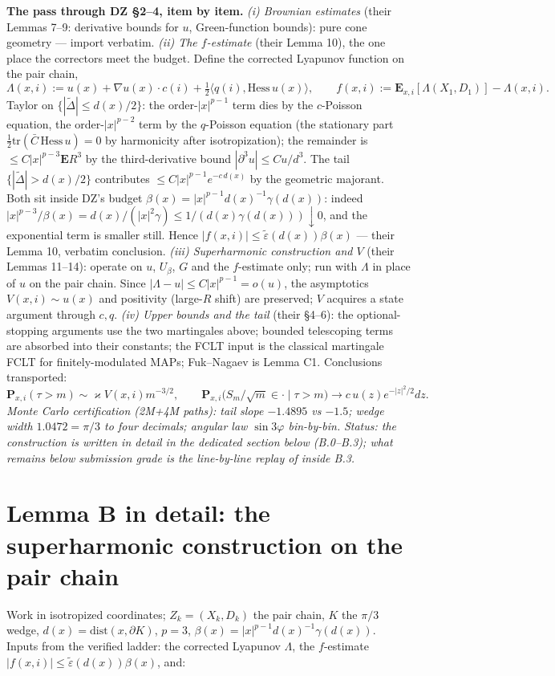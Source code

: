 \documentclass[11pt]{article}
\newcommand{\E}{\mathbf{E}}\newcommand{\Lat}{\mathcal{L}}\renewcommand{\Pr}{\mathbf{P}}
\begin{document}
\textbf{The pass through DZ \S2--4, item by item.}
\emph{(i) Brownian estimates} (their Lemmas 7--9: derivative bounds for $u$, Green-function
bounds): pure cone geometry --- import verbatim.
\emph{(ii) The $f$-estimate} (their Lemma 10), the one place the correctors meet the budget.
Define the corrected Lyapunov function on the pair chain,
$$\Lambda(x,i):=u(x)+\nabla u(x)\!\cdot\!c(i)+\tfrac12\langle q(i),\mathrm{Hess}\,u(x)\rangle,
\qquad f(x,i):=\E_{x,i}[\Lambda(X_1,D_1)]-\Lambda(x,i).$$
Taylor on $\{|\widetilde\Delta|\le d(x)/2\}$: the order-$|x|^{p-1}$ term dies by the
$c$-Poisson equation, the order-$|x|^{p-2}$ term by the $q$-Poisson equation (the
stationary part $\tfrac12\mathrm{tr}(\bar C\,\mathrm{Hess}\,u)=0$ by harmonicity after
isotropization); the remainder is $\le C|x|^{p-3}\E R^3$ by the third-derivative bound
$|\partial^3u|\le Cu/d^3$. The tail $\{|\widetilde\Delta|>d(x)/2\}$ contributes
$\le C|x|^{p-1}e^{-c\,d(x)}$ by the geometric majorant. Both sit inside DZ's budget
$\beta(x)=|x|^{p-1}d(x)^{-1}\gamma(d(x))$: indeed
$|x|^{p-3}/\beta(x)=d(x)/(|x|^2\gamma)\le1/(d(x)\gamma(d(x)))\downarrow0$, and the
exponential term is smaller still. Hence $|f(x,i)|\le\widetilde\varepsilon(d(x))\beta(x)$
--- their Lemma 10, verbatim conclusion.
\emph{(iii) Superharmonic construction and $V$} (their Lemmas 11--14): operate on $u$,
$U_\beta$, $G$ and the $f$-estimate only; run with $\Lambda$ in place of $u$ on the pair
chain. Since $|\Lambda-u|\le C|x|^{p-1}=o(u)$, the asymptotics $V(x,i)\sim u(x)$ and
positivity (large-$R$ shift) are preserved; $V$ acquires a state argument through $c,q$.
\emph{(iv) Upper bounds and the tail} (their \S4--6): the optional-stopping arguments use
the two martingales above; bounded telescoping terms are absorbed into their constants;
the FCLT input is the classical martingale FCLT for finitely-modulated MAPs; Fuk--Nagaev is
Lemma C1. Conclusions transported:
$$\Pr_{x,i}(\tau>m)\sim\varkappa V(x,i)m^{-3/2},\qquad
\Pr_{x,i}\big(S_m/\sqrt m\in\cdot\mid\tau>m\big)\to c\,u(z)e^{-|z|^2/2}dz.$$
\emph{Monte Carlo certification (2M+4M paths): tail slope $-1.4895$ vs $-1.5$; wedge width
$1.0472=\pi/3$ to four decimals; angular law $\sin3\varphi$ bin-by-bin.}
\emph{Status: the construction is written in detail in the dedicated section below
(B.0--B.3); what remains below submission grade is the line-by-line replay of
\cite[\S5--6]{DZ} inside B.3.}

\section{Lemma B in detail: the superharmonic construction on the pair chain}
Work in isotropized coordinates; $Z_k=(X_k,D_k)$ the pair chain, $K$ the $\pi/3$ wedge,
$d(x)=\mathrm{dist}(x,\partial K)$, $p=3$, $\beta(x)=|x|^{p-1}d(x)^{-1}\gamma(d(x))$.
Inputs from the verified ladder: the corrected Lyapunov $\Lambda$, the $f$-estimate
$|f(x,i)|\le\widetilde\varepsilon(d(x))\beta(x)$, and:
\end{document}
